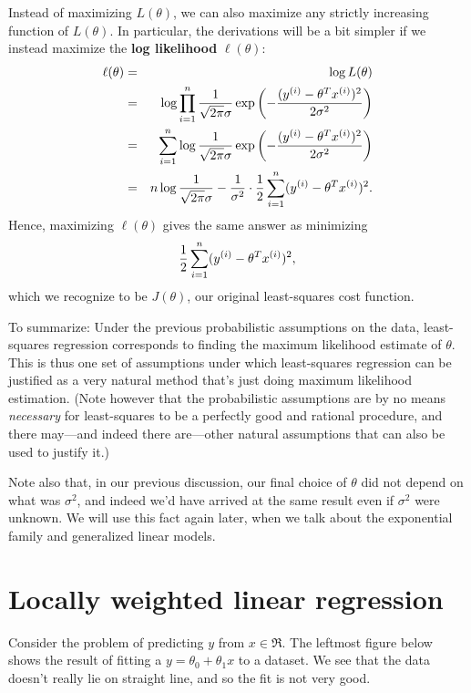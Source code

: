 \documentclass{article}
\begin{document}
Instead of maximizing $L(\theta)$, we can also maximize any strictly
increasing function of $L(\theta)$.  In particular, the derivations
will be a bit simpler if we instead maximize the {\bf log likelihood} $\ell(\theta)$:
\begin{eqnarray*}
\ell(\theta) &=&\log L(\theta) \\
&=& \log \prod_{i=1}^{n} \frac{1}{\sqrt{2\pi}\sigma} \exp\left(-\frac{({y^{(i)}} - \theta^T{x^{(i)}})^2}{2\sigma^2}\right)\\
&=& \sum_{i=1}^{n} \log \frac{1}{\sqrt{2\pi}\sigma} \exp\left(-\frac{({y^{(i)}} - \theta^T{x^{(i)}})^2}{2\sigma^2}\right)\\
&=& {n} \log \frac{1}{\sqrt{2\pi}\sigma} - \frac{1}{\sigma^2} \cdot \frac{1}{2} \sum_{i=1}^{n} ({y^{(i)}} - \theta^T{x^{(i)}})^2.
\end{eqnarray*}
Hence, maximizing $\ell(\theta)$ gives the same answer as minimizing
\[
\frac{1}{2} \sum_{i=1}^{n} ({y^{(i)}} - \theta^T{x^{(i)}})^2,
\]
which we recognize to be $J(\theta)$, our original least-squares cost function.

To summarize: Under the previous probabilistic assumptions on the data,
least-squares regression corresponds to finding the maximum likelihood
estimate of $\theta$.  This is thus one set of assumptions under which
least-squares regression can be justified as a very natural method that's
just doing maximum likelihood estimation.  (Note however that the
probabilistic assumptions are by no means \emph{necessary} for least-squares
to be a perfectly good and rational procedure, and there may---and indeed
there are---other natural assumptions that can also be used to justify it.)

Note also that, in our previous discussion, our final choice of $\theta$ did
not depend on what was $\sigma^2$, and indeed we'd have arrived at the
same result even if $\sigma^2$ were unknown.
We will use this fact again later, when we talk about the
exponential family and generalized linear models.

\section{Locally weighted linear regression}

Consider the problem of predicting $y$ from $x \in \Re$.  The leftmost figure
below shows the result of fitting a $y = \theta_0 + \theta_1 x$ to a dataset.
We see that the data doesn't really lie on straight line, and so the fit is
not very good.
\end{document}
